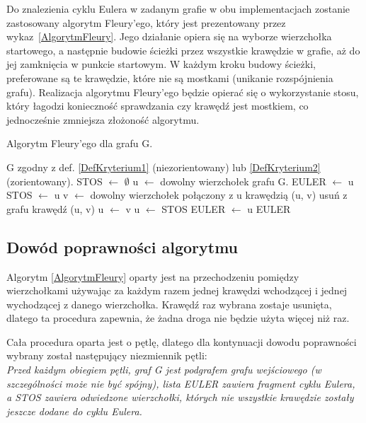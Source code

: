Do znalezienia cyklu Eulera w zadanym grafie w obu implementacjach zostanie zastosowany algorytm Fleury'ego, który jest prezentowany przez wykaz~\ref{AlgorytmFleury}.
Jego działanie opiera się na wyborze wierzchołka startowego, a następnie budowie ścieżki przez wszystkie krawędzie w grafie, aż do jej zamknięcia w punkcie startowym. 
W każdym kroku budowy ścieżki, preferowane są te krawędzie, które nie są mostkami (unikanie rozspójnienia grafu).
Realizacja algorytmu Fleury'ego będzie opierać się o wykorzystanie stosu, który łagodzi konieczność sprawdzania czy krawędź jest mostkiem, co jednocześnie zmniejsza złożoność algorytmu.

\begin{algorithm}
\caption{Algorytm Fleury'ego dla grafu G.}
\label{AlgorytmFleury}
\begin{algorithmic}
\Require G zgodny z def. \ref{DefKryterium1} (niezorientowany) lub \ref{DefKryterium2} (zorientowany).
\State STOS $\gets$ $\emptyset$
\State u $\gets$ dowolny wierzchołek grafu G.
\State EULER $\gets$  u
\State
\Repeat
		\State STOS $\gets$ u
		\State v $\gets$ dowolny wierzchołek połączony z u krawędzią (u, v)
		\State usuń z grafu krawędź (u, v)
		\State u $\gets$ v
	\Else
		\State u $\gets$ STOS
		\State EULER $\gets$ u
	\EndIf
{}
\State
\State \Return EULER 
\end{algorithmic}
\end{algorithm}



\subsection{Dowód poprawności algorytmu}

Algorytm \ref{AlgorytmFleury} oparty jest na przechodzeniu pomiędzy wierzchołkami używając za każdym razem jednej krawędzi wchodzącej i jednej wychodzącej z danego wierzchołka. 
Krawędź raz wybrana zostaje usunięta, dlatego ta procedura zapewnia, że żadna droga nie będzie użyta więcej niż raz.

Cała procedura oparta jest o pętlę, dlatego dla kontynuacji dowodu poprawności wybrany został następujący niezmiennik pętli: \\
\textit{Przed każdym obiegiem pętli, graf G jest podgrafem grafu wejściowego (w szczególności może nie być spójny), lista EULER zawiera fragment cyklu Eulera, a STOS zawiera odwiedzone wierzchołki, których nie wszystkie krawędzie zostały jeszcze dodane do cyklu Eulera.}

